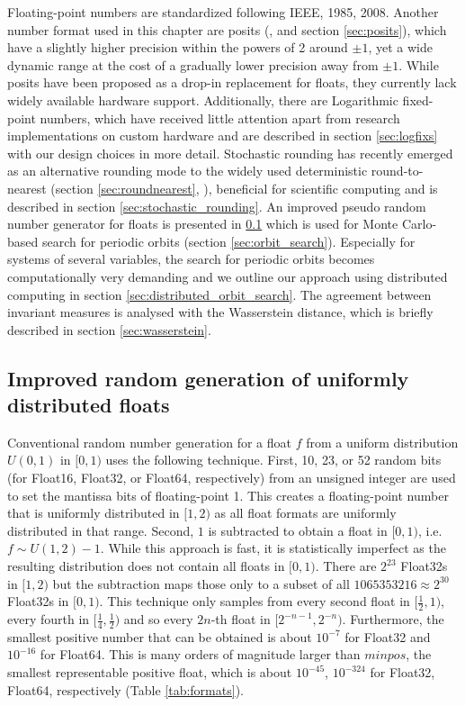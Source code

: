 Floating-point numbers are standardized following IEEE, 1985, 2008. Another number format used in this chapter are posits
(\cite{Gustafson2017a}, and section \ref{sec:posits}), which have a slightly higher precision within the powers of 2
around $\pm1$, yet a wide dynamic range at the cost of a gradually lower precision away from $\pm1$. While posits
have been proposed as a drop-in replacement for floats, they currently lack widely available hardware support.
Additionally, there are Logarithmic fixed-point numbers, which have received little attention apart from research
implementations on custom hardware \citep{Johnson2020} and are described in section \ref{sec:logfixs} with our
design choices in more detail. Stochastic rounding has recently emerged as an alternative rounding mode to the
widely used deterministic round-to-nearest (section \ref{sec:roundnearest}, \cite{IEEE1985}), beneficial for scientific computing
\citep{Croci2020,Fasi2021,Hopkins2020,Paxton2021} and is described in section \ref{sec:stochastic_rounding}.
An improved pseudo random number generator for floats is presented in \ref{sec:randfloat} which is used for Monte
Carlo-based search for periodic orbits (section \ref{sec:orbit_search}). Especially for systems of several variables,
the search for periodic orbits becomes computationally very demanding and we outline our approach using
distributed computing in section \ref{sec:distributed_orbit_search}. The agreement between invariant measures
is analysed with the Wasserstein distance, which is briefly described in section \ref{sec:wasserstein}.

\subsection[Improved random number generation of floats]{Improved random generation of uniformly distributed floats}
\label{sec:randfloat}

Conventional random number generation for a float $f$ from a uniform distribution $U(0,1)$
in $[0,1)$ uses the following technique. First, 10, 23, or 52 random bits (for Float16, Float32, or Float64, respectively)
from an unsigned integer are used to set the mantissa bits of floating-point 1. This creates a floating-point
number that is uniformly distributed in $[1,2)$ as all float formats are uniformly distributed in that range. Second,
$1$ is subtracted to obtain a float in $[0,1)$, i.e. $f \sim U(1,2) - 1$. While this approach is fast, it is statistically
imperfect as the resulting distribution does not contain all floats in $[0,1)$. There are $2^{23}$ Float32s in $[1,2)$
but the subtraction maps those only to a subset of all $1065353216 \approx 2^{30}$ Float32s in $[0,1)$.
This technique only samples from every second float in $[\tfrac{1}{2},1)$, every fourth in
$[\tfrac{1}{4},\tfrac{1}{2})$ and so every $2n$-th float in $[2^{-n-1},2^{-n})$. Furthermore, the smallest positive
number that can be obtained is about $10^{-7}$ for Float32 and $10^{-16}$ for Float64. This is many orders of
magnitude larger than $minpos$, the smallest representable positive float, which is about $10^{-45}$, $10^{-324}$
for Float32, Float64, respectively (Table \ref{tab:formats}).

